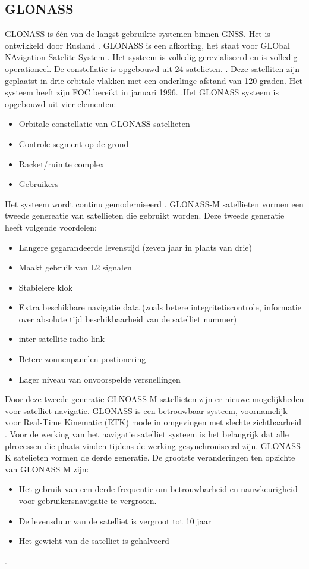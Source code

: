 \subsection{GLONASS}
\label{LGLO}
GLONASS is \'e\'en van de langst gebruikte systemen binnen GNSS. Het is ontwikkeld door Rusland \cite{LBibGLONASS2}. GLONASS is een afkorting, het staat voor GLObal NAvigation Satelite System \cite{LBibBeiDou}. Het systeem is volledig gerevialiseerd en is volledig operationeel. De constellatie is opgebouwd uit 24 satelieten. \cite{LBibGNSS4}. Deze satelliten zijn geplaatst in drie orbitale vlakken met een onderlinge afstand van 120 graden\cite{LBibGLONASS2}. Het systeem heeft zijn FOC bereikt in januari 1996. \cite{LBibGLONASS}.Het GLONASS systeem is opgebouwd uit vier elementen:
\begin{itemize}
	\item Orbitale constellatie van GLONASS satellieten
	\item Controle segment op de grond
	\item Racket/ruimte complex
	\item Gebruikers
\end{itemize} \cite{LBibGLONASS2} Het systeem wordt continu gemoderniseerd \cite{LBibGNSS4}. GLONASS-M satellieten vormen een tweede genereatie van satellieten die gebruikt worden. Deze tweede generatie heeft volgende voordelen:
\begin{itemize}
	\item Langere gegarandeerde levenstijd (zeven jaar in plaats van drie)
	\item Maakt gebruik van L2 signalen
	\item Stabielere klok
	\item Extra beschikbare navigatie data (zoals betere integritetiscontrole, informatie over absolute tijd beschikbaarheid van de satelliet nummer)
	\item inter-satellite radio link
	\item Betere zonnenpanelen postionering
	\item Lager niveau van onvoorspelde versnellingen
\end{itemize}
Door deze tweede generatie GLNOASS-M satellieten zijn er nieuwe mogelijkheden voor satelliet navigatie. GLONASS is een betrouwbaar systeem, voornamelijk voor Real-Time Kinematic (RTK) mode in omgevingen met slechte zichtbaarheid \cite{LBibGLONASS}. Voor de werking van het navigatie satelliet systeem is het belangrijk dat alle plrocessen die plaats vinden tijdens de werking gesynchroniseerd zijn. GLONASS-K satelieten vormen de derde generatie. De grootste veranderingen ten opzichte van GLONASS M zijn:
\begin{itemize}
	\item Het gebruik van een derde frequentie om betrouwbarheid en nauwkeurigheid voor gebruikersnavigatie te vergroten.
	\item De levensduur van de satelliet is vergroot tot 10 jaar
	\item Het gewicht van de satelliet is gehalveerd
\end{itemize}\cite{LBibGLONASS2}.

